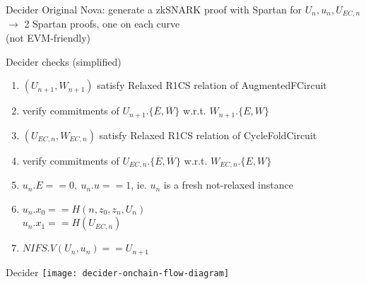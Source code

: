 \documentclass[t]{beamer}
\begin{document}
\begin{frame}{Decider}
  Original Nova: generate a zkSNARK proof with Spartan for $U_n, u_n, U_{EC, n}$\\
  $\longrightarrow$ 2 Spartan proofs, one on each curve\\
  (not EVM-friendly)


\end{frame}

\begin{frame}{Decider}
  checks (simplified)
  \begin{enumerate}
    \item $(U_{n+1}, W_{n+1})$ satisfy Relaxed R1CS relation of AugmentedFCircuit
    \item verify commitments of $U_{n+1}.\{\overline{E}, \overline{W}\}$ w.r.t. $W_{n+1}.\{E,W\}$
    \item $(U_{EC,n}, W_{EC,n})$ satisfy Relaxed R1CS relation of CycleFoldCircuit
    \item verify commitments of $U_{EC,n}.\{\overline{E}, \overline{W}\}$ w.r.t. $W_{EC,n}.\{E,W\}$
    \item $u_n.E==0,~ u_n.u==1$, ie. $u_n$ is a fresh not-relaxed instance
    \item $u_n.x_0==H(n, z_0, z_n, U_n)$\\
          $u_n.x_1==H(U_{EC,n})$
    \item $NIFS.V(U_n, u_n)==U_{n+1}$
  \end{enumerate}

\end{frame}

\begin{frame}{Decider}
  \texttt{[image: decider-onchain-flow-diagram]}
\end{frame}
\end{document}
